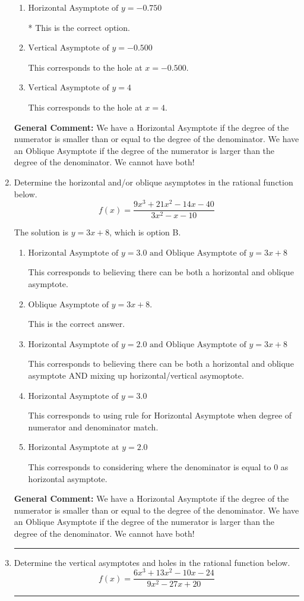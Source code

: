 \documentclass{extbook}[14pt]
\newcommand{\litem}[1]{\item #1

\rule{\textwidth}{0.4pt}}
\begin{document}
\begin{enumerate}
{\begin{enumerate}[label=\Alph*.]
This corresponds to believing there should be an oblique asymptote.
\item \( \text{Horizontal Asymptote of } y = -0.750  \)

* This is the correct option.
\item \( \text{Vertical Asymptote of } y = -0.500  \)

This corresponds to the hole at $x = -0.500$.
\item \( \text{Vertical Asymptote of } y = 4  \)

This corresponds to the hole at $x = 4$.
\end{enumerate}

\textbf{General Comment:} We have a Horizontal Asymptote if the degree of the numerator is smaller than or equal to the degree of the denominator. We have an Oblique Asymptote if the degree of the numerator is larger than the degree of the denominator. We cannot have both!
}
\litem{
Determine the horizontal and/or oblique asymptotes in the rational function below.
\[ f(x) = \frac{9x^{3} +21 x^{2} -14 x -40}{3x^{2} -x -10} \]

The solution is \( y = 3x + 8 \), which is option B.\begin{enumerate}[label=\Alph*.]
\item \( \text{Horizontal Asymptote of } y = 3.0 \text{ and Oblique Asymptote of } y = 3x + 8 \)

This corresponds to believing there can be both a horizontal and oblique asymptote.
\item \( \text{Oblique Asymptote of } y = 3x + 8. \)

This is the correct answer.
\item \( \text{Horizontal Asymptote of } y = 2.0 \text{ and Oblique Asymptote of } y = 3x + 8 \)

This corresponds to believing there can be both a horizontal and oblique asymptote AND mixing up horizontal/vertical asymoptote.
\item \( \text{Horizontal Asymptote of } y = 3.0  \)

This corresponds to using rule for Horizontal Asymptote when degree of numerator and denominator match.
\item \( \text{Horizontal Asymptote at } y = 2.0 \)

This corresponds to considering where the denominator is equal to 0 as horizontal asymptote.
\end{enumerate}

\textbf{General Comment:} We have a Horizontal Asymptote if the degree of the numerator is smaller than or equal to the degree of the denominator. We have an Oblique Asymptote if the degree of the numerator is larger than the degree of the denominator. We cannot have both!
}
\litem{
Determine the vertical asymptotes and holes in the rational function below.
\[ f(x) = \frac{6x^{3} +13 x^{2} -10 x -24}{9x^{2} -27 x + 20} \]

}
\end{enumerate}
\end{document}

